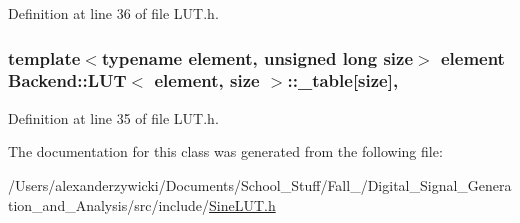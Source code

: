 Definition at line 36 of file L\+U\+T.\+h.

\hypertarget{class_backend_1_1_l_u_t_ae70f3f0c9aaa9e0b85517d8e2c61d9a5}{
\subsubsection[{\+\_\+table}]{\setlength{\rightskip}{0pt plus 5cm}template$<$typename element, unsigned long size$>$ element {\bf Backend\+::\+L\+U\+T}$<$ element, size $>$\+::\+\_\+table\mbox{[}size\mbox{]}\hspace{0.3cm}{\ttfamily [protected]}, {\ttfamily [inherited]}}}\label{class_backend_1_1_l_u_t_ae70f3f0c9aaa9e0b85517d8e2c61d9a5}


Definition at line 35 of file L\+U\+T.\+h.



The documentation for this class was generated from the following file\+:\begin{DoxyCompactItemize}
\item 
/\+Users/alexanderzywicki/\+Documents/\+School\+\_\+\+Stuff/\+Fall\+\_/\+Digital\+\_\+\+Signal\+\_\+\+Generation\+\_\+and\+\_\+\+Analysis/src/include/\hyperlink{_sine_l_u_t_8h}{Sine\+L\+U\+T.\+h}\end{DoxyCompactItemize}
